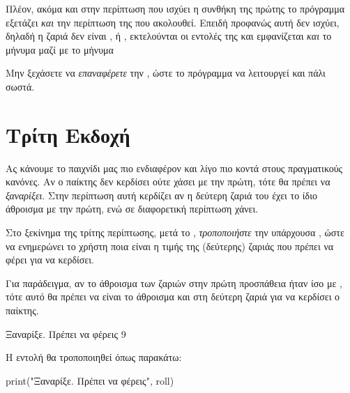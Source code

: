 \documentclass[a4paper,11pt,oneside]{book}
\begin{document}
\begin{step}
\begin{answer}
Πλέον, ακόμα και στην περίπτωση που ισχύει η συνθήκη της πρώτης  το πρόγραμμα εξετάζει \emph{και} την περίπτωση της  που ακολουθεί. Επειδή προφανώς αυτή δεν ισχύει, δηλαδή η ζαριά δεν είναι , ή , εκτελούνται οι εντολές της  και εμφανίζεται \emph{και} το μήνυμα  μαζί με το μήνυμα 
\end{answer}

\marginnote[18pt]{\iconcaution}
Μην ξεχάσετε να \emph{επαναφέρετε} την , ώστε το πρόγραμμα να λειτουργεί και πάλι σωστά.
\end{step}

\section{Τρίτη Εκδοχή}

Ας κάνουμε το παιχνίδι μας πιο ενδιαφέρον και λίγο πιο κοντά στους πραγματικούς κανόνες. Αν ο παίκτης δεν κερδίσει ούτε χάσει με την πρώτη, τότε θα πρέπει να \emph{ξαναρίξει}. Στην περίπτωση αυτή κερδίζει αν η δεύτερη ζαριά του έχει το ίδιο άθροισμα με την πρώτη, ενώ σε διαφορετική περίπτωση χάνει.

\begin{step}
Στο ξεκίνημα της τρίτης περίπτωσης, μετά το , \emph{τροποποιήστε} την υπάρχουσα , ώστε να ενημερώνει το χρήστη ποια είναι η τιμής της (δεύτερης) ζαριάς που πρέπει να φέρει για να κερδίσει. 

Για παράδειγμα, αν το άθροισμα των ζαριών στην πρώτη προσπάθεια ήταν ίσο με , τότε αυτό θα πρέπει να είναι το άθροισμα και στη δεύτερη ζαριά για να κερδίσει ο παίκτης.

\marginnote[16pt]{\iconcomputer}
\begin{pyterm}
Ξαναρίξε. Πρέπει να φέρεις 9
\end{pyterm}

\begin{answer}
Η εντολή  θα τροποποιηθεί όπως παρακάτω:

\begin{pynew}
print("Ξαναρίξε. Πρέπει να φέρεις", roll)
\end{pynew}
\end{answer}
\end{step}
\end{document}
